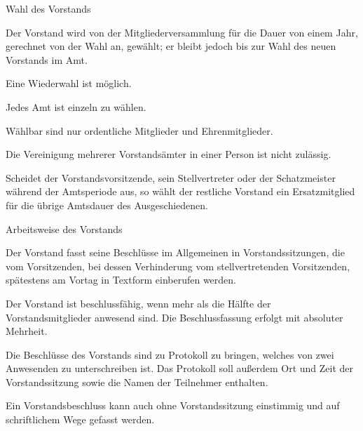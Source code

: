 \documentclass[11pt,a4paper,twoside,openany,article]{memoir}
\begin{document}
\begin{para}{Wahl des Vorstands}
  \label{p:vswahl}
  \item Der Vorstand wird von der Mitgliederversammlung für die Dauer von einem Jahr, gerechnet von der Wahl an, gewählt; er bleibt jedoch bis zur Wahl des neuen Vorstands im Amt.
  \item Eine Wiederwahl ist möglich.
  \item Jedes Amt ist einzeln zu wählen.
  \item Wählbar sind nur ordentliche Mitglieder und Ehrenmitglieder.
  \item Die Vereinigung mehrerer Vorstandsämter in einer Person ist nicht zulässig.
  \item Scheidet der Vorstandsvorsitzende, sein Stellvertreter oder der Schatzmeister während der Amtsperiode aus, so wählt der restliche Vorstand ein Ersatzmitglied für die übrige Amtsdauer des Ausgeschiedenen.
\end{para}

\begin{para}{Arbeitsweise des Vorstands}
  \label{p:vsarbeitsweise}
  \item Der Vorstand fasst seine Beschlüsse im Allgemeinen in Vorstandssitzungen, die vom Vorsitzenden, bei dessen Verhinderung vom stellvertretenden Vorsitzenden, spätestens am Vortag in Textform einberufen werden.
  \item Der Vorstand ist beschlussfähig, wenn mehr als die Hälfte der Vorstandsmitglieder anwesend sind. Die Beschlussfassung erfolgt mit absoluter Mehrheit.
  \item Die Beschlüsse des Vorstands sind zu Protokoll zu bringen, welches von zwei Anwesenden zu unterschreiben ist. Das Protokoll soll außerdem Ort und Zeit der Vorstandssitzung sowie die Namen der Teilnehmer enthalten.
  \item Ein Vorstandsbeschluss kann auch ohne Vorstandssitzung einstimmig und auf schriftlichem Wege gefasst werden.
\end{para}
\end{document}
